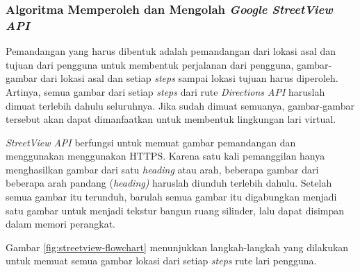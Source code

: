 \subsubsection{Algoritma Memperoleh dan Mengolah \textit{Google StreetView API}} 
Pemandangan yang harus dibentuk adalah pemandangan dari lokasi asal dan tujuan dari pengguna untuk membentuk perjalanan dari pengguna, gambar-gambar dari lokasi asal dan setiap \textit{steps} sampai lokasi tujuan harus diperoleh. Artinya, semua gambar dari setiap \textit{steps} dari rute \textit{Directions API} haruslah dimuat terlebih dahulu seluruhnya. Jika sudah dimuat semuanya, gambar-gambar tersebut akan dapat dimanfaatkan untuk membentuk lingkungan lari virtual.   

\textit{StreetView API} berfungsi untuk memuat gambar pemandangan dan menggunakan menggunakan HTTPS. Karena satu kali pemanggilan hanya menghasilkan gambar dari satu \textit{heading} atau arah, beberapa gambar dari beberapa arah pandang (\textit{heading)} haruslah diunduh terlebih dahulu. Setelah semua gambar itu terunduh, barulah semua gambar itu digabungkan menjadi satu gambar untuk menjadi tekstur bangun ruang silinder, lalu dapat disimpan dalam memori perangkat.

Gambar \ref{fig:streetview-flowchart} menunjukkan langkah-langkah yang dilakukan untuk memuat semua gambar lokasi dari setiap \textit{steps} rute lari pengguna.
	
